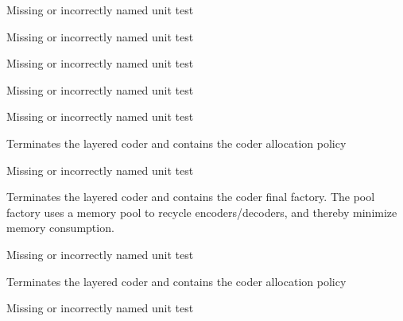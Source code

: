 \begin{DoxyRefList}
\item[\label{todo__todo000012}%
\hypertarget{todo__todo000012}{}%
Class \hyperlink{classkodo_1_1encode__symbol__tracker}{kodo\-:\-:encode\-\_\-symbol\-\_\-tracker$<$ Super\-Coder $>$} ]Missing or incorrectly named unit test


\item[\label{todo__todo000013}%
\hypertarget{todo__todo000013}{}%
Class \hyperlink{classkodo_1_1fake__symbol__storage}{kodo\-:\-:fake\-\_\-symbol\-\_\-storage$<$ Super\-Coder $>$} ]Missing or incorrectly named unit test


\item[\label{todo__todo000014}%
\hypertarget{todo__todo000014}{}%
Class \hyperlink{classkodo_1_1file__encoder}{kodo\-:\-:file\-\_\-encoder$<$ Encoder\-Type, Block\-Partitioning $>$} ]Missing or incorrectly named unit test  
\item[\label{todo__todo000015}%
\hypertarget{todo__todo000015}{}%
Class \hyperlink{classkodo_1_1file__reader}{kodo\-:\-:file\-\_\-reader$<$ Encoder\-Type $>$} ]Missing or incorrectly named unit test


\item[\label{todo__todo000016}%
\hypertarget{todo__todo000016}{}%
Class \hyperlink{classkodo_1_1final__coder__factory}{kodo\-:\-:final\-\_\-coder\-\_\-factory$<$ Final\-Type $>$} ]Missing or incorrectly named unit test

Terminates the layered coder and contains the coder allocation policy  
\item[\label{todo__todo000017}%
\hypertarget{todo__todo000017}{}%
Class \hyperlink{classkodo_1_1final__coder__factory__pool}{kodo\-:\-:final\-\_\-coder\-\_\-factory\-\_\-pool$<$ Final\-Type $>$} ]Missing or incorrectly named unit test

Terminates the layered coder and contains the coder final factory. The pool factory uses a memory pool to recycle encoders/decoders, and thereby minimize memory consumption.  
\item[\label{todo__todo000018}%
\hypertarget{todo__todo000018}{}%
Class \hyperlink{classkodo_1_1finite__field__info}{kodo\-:\-:finite\-\_\-field\-\_\-info$<$ Field, Super\-Coder $>$} ]Missing or incorrectly named unit test

Terminates the layered coder and contains the coder allocation policy  
\item[\label{todo__todo000019}%
\hypertarget{todo__todo000019}{}%
Class \hyperlink{classkodo_1_1finite__field__math}{kodo\-:\-:finite\-\_\-field\-\_\-math$<$ Field\-Impl, Super\-Coder $>$} ]Missing or incorrectly named unit test



\end{DoxyRefList}
